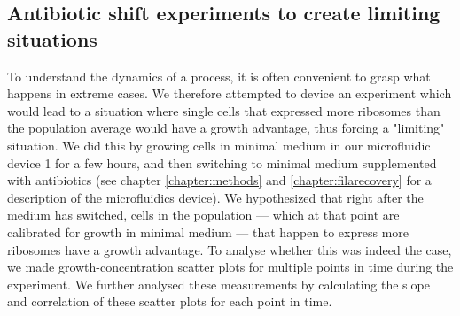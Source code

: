 \subsection{Antibiotic shift experiments to create limiting situations}


To understand the dynamics of a process, it is often convenient to grasp what happens in extreme cases.
%
We therefore attempted to device an experiment which would lead to a situation where single cells that expressed more ribosomes than the population average would have a growth advantage, thus forcing a "limiting" situation.
% 
We did this by growing cells in minimal medium in our microfluidic device 1 for a few hours, and then switching to minimal medium supplemented with antibiotics (see chapter \ref{chapter:methods} and \ref{chapter:filarecovery} for a description of the microfluidics device).
%
We hypothesized that right after the medium has switched, cells in the population --- which at that point are calibrated for growth in minimal medium --- that happen to express more ribosomes have a growth advantage.
%
To analyse whether this was indeed the case, we made growth-concentration scatter plots for multiple points in time during the experiment.
%
We further analysed these measurements by calculating the slope and correlation of these scatter plots for each point in time.

